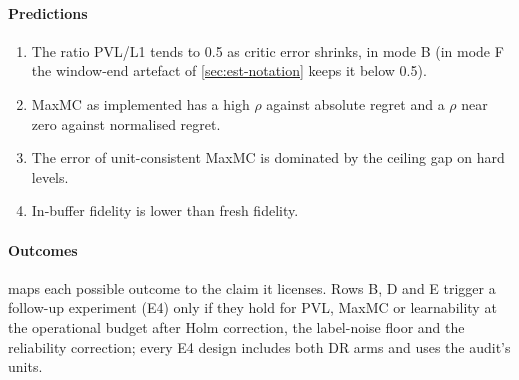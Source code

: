 \paragraph{Predictions}
\begin{enumerate}[(P1)]
  \item The ratio PVL/L1 tends to 0.5 as critic error shrinks, in mode B (in mode F the
        window-end artefact of \cref{sec:est-notation} keeps it below 0.5).
  \item MaxMC as implemented has a high $\rho$ against absolute regret and a $\rho$ near
        zero against normalised regret.
  \item The error of unit-consistent MaxMC is dominated by the ceiling gap on hard levels.
  \item In-buffer fidelity is lower than fresh fidelity.
\end{enumerate}

\paragraph{Outcomes}  maps each possible outcome to the claim it
licenses. Rows B, D and E trigger a follow-up experiment (E4) only if they hold for PVL,
MaxMC or learnability at the operational budget after Holm correction, the label-noise
floor and the reliability correction; every E4 design includes both DR arms and uses the
audit's units.

